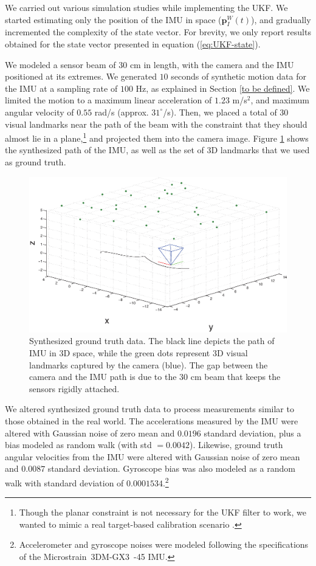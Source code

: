 \documentclass[letterpaper]{article}
\newcommand{\bb}[1]{\mathbf{#1}}
\begin{document}

We carried out various simulation studies while implementing the
UKF. We started estimating only the position of the IMU in space
($\bb{p}_I^W(t)$), and gradually incremented the complexity of the
state vector. For brevity, we only report results obtained for the
state vector presented in equation (\ref{eq:UKF-state}).

We modeled a sensor beam of $30$ cm in length, with the camera and the
IMU positioned at its extremes. We generated $10$ seconds of synthetic
motion data for the IMU at a sampling rate of $100$ Hz, as explained
in Section \ref{to be defined}. We limited the motion to a maximum
linear acceleration of $1.23$ m/s$^2$, and maximum angular velocity of
$0.55$ rad/s (approx. $31^\circ$/s).  Then, we placed a total of 30
visual landmarks near the path of the beam with the constraint that
they should almost lie in a plane,\footnote{Though the planar
  constraint is not necessary for the UKF filter to work, we wanted to
  mimic a real target-based calibration scenario
  \cite{2011:kelly:article}.} and projected them into the camera
image.  Figure \ref{fig:groundtruth} shows the synthesized path of the
IMU, as well as the set of 3D landmarks that we used as ground truth.
\begin{figure}[h!p]
\centering
\includegraphics[width=.7\linewidth]{groundTruth.eps}
\vspace{-0.5em}
\caption{Synthesized ground truth data. The black line depicts the
  path of IMU in 3D space, while the green dots represent 3D visual
  landmarks captured by the camera (blue). The gap between the camera
  and the IMU path is due to the $30$ cm beam that keeps the sensors
  rigidly attached.}
\label{fig:groundtruth}
\end{figure}

We altered synthesized ground truth data to process measurements
similar to those obtained in the real world. The accelerations
measured by the IMU were altered with Gaussian noise of zero mean and
$0.0196$ standard deviation, plus a bias modeled as random walk (with
std $= 0.0042$). Likewise, ground truth angular velocities from the
IMU were altered with Gaussian noise of zero mean and $0.0087$
standard deviation. Gyroscope bias was also modeled as a random walk
with standard deviation of $0.0001534$.\footnote{Accelerometer and
  gyroscope noises were modeled following the specifications of the
  Microstrain\textregistered\ 3DM-GX3\textregistered\ -45 IMU.}
\end{document}

